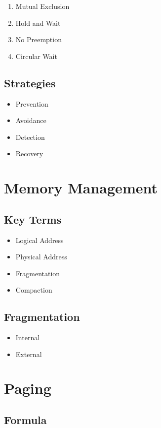 \begin{enumerate}
\item Mutual Exclusion
\item Hold and Wait
\item No Preemption
\item Circular Wait
\end{enumerate}

\subsection*{Strategies}

\begin{itemize}
\item Prevention
\item Avoidance
\item Detection
\item Recovery
\end{itemize}

\section{Memory Management}

\subsection*{Key Terms}

\begin{itemize}
\item Logical Address
\item Physical Address
\item Fragmentation
\item Compaction
\end{itemize}

\subsection*{Fragmentation}

\begin{itemize}
\item Internal
\item External
\end{itemize}

\section{Paging}

\subsection*{Formula}


